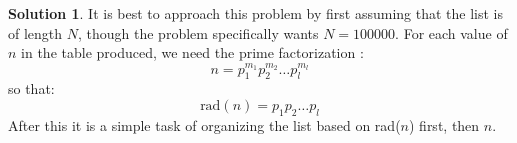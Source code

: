 \documentclass[12pt, letterpaper, onecolumn, conference, final]{IEEEtran}
\theoremstyle{definition}
\newtheorem*{solution*}{Solution}
\theoremstyle{plain}
\begin{document}
\vspace{.3cm}
\begin{solution*}
It is best to approach this problem by first assuming that the list is of length $N$, though the problem specifically wants $N=100000$. For each value of $n$ in the table produced, we need the prime factorization \footnotemark:
\begin{equation*}
n = p_1^{m_1} p_2^{m_2} \dots p_l^{m_l}
\end{equation*}
so that:
\begin{equation*}
\text{rad}(n) = p_1 p_2 \dots p_l
\end{equation*}
After this it is a simple task of organizing the list based on rad($n$) first, then $n$. 
\end{solution*}

\end{document}
